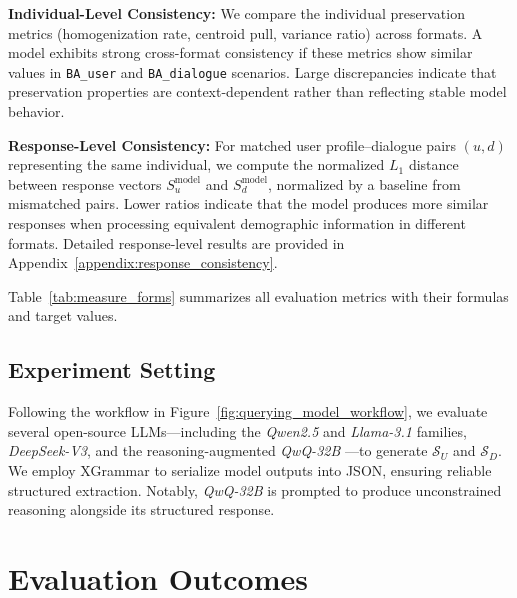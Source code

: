 \documentclass[final]{clv2025}
\newcommand{\paratitle}[1]{\smallskip\noindent\textbf{#1}}
\begin{document}
\paratitle{Individual-Level Consistency:}
We compare the individual preservation metrics (homogenization rate, centroid pull, variance ratio) across formats. A model exhibits strong cross-format consistency if these metrics show similar values in \texttt{BA\_user} and \texttt{BA\_dialogue} scenarios. Large discrepancies indicate that preservation properties are context-dependent rather than reflecting stable model behavior.

\paratitle{Response-Level Consistency:}
For matched user profile--dialogue pairs $(u, d)$ representing the same individual, we compute the normalized $L_1$ distance between response vectors $S_u^{\text{model}}$ and $S_d^{\text{model}}$, normalized by a baseline from mismatched pairs. Lower ratios indicate that the model produces more similar responses when processing equivalent demographic information in different formats. Detailed response-level results are provided in Appendix~\ref{appendix:response_consistency}.

Table~\ref{tab:measure_forms} summarizes all evaluation metrics with their formulas and target values.

\subsection{Experiment Setting}

Following the workflow in Figure~\ref{fig:querying_model_workflow}, we evaluate several open-source LLMs---including the \textit{Qwen2.5} and \textit{Llama-3.1} families, \textit{DeepSeek-V3}, and the reasoning-augmented \textit{QwQ-32B} \citep{qwen2025qwen25technicalreport, dubey2024llama3herdmodels, deepseekai2025deepseekv3technicalreport}---to generate $\mathcal{S}_U$ and $\mathcal{S}_D$. We employ XGrammar \citep{dong2025xgrammar} to serialize model outputs into JSON, ensuring reliable structured extraction. Notably, \textit{QwQ-32B} is prompted to produce unconstrained reasoning alongside its structured response.

\section{Evaluation Outcomes}
\label{sec:evaluation_outcomes}
\end{document}
